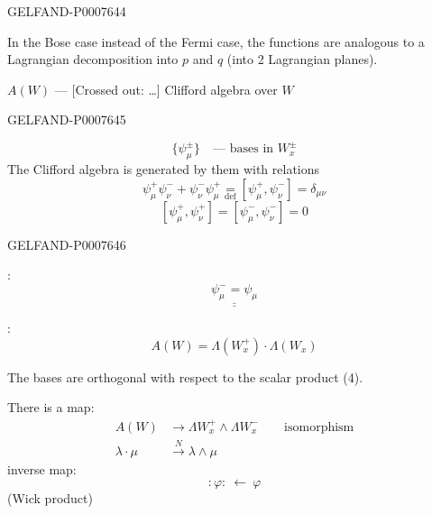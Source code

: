 \begin{GelfandAdjacentEvidence}{GELFAND-P000764}{4}


In the Bose case instead of the Fermi case, the functions are analogous to a Lagrangian decomposition into \(p\) and \(q\) (into 2 Lagrangian planes).

\(A(W)\) --- [Crossed out: …] Clifford algebra over \(W\)
\end{GelfandAdjacentEvidence}
\begin{GelfandAdjacentEvidence}{GELFAND-P000764}{5}

\[
\{\psi_\mu^\pm\}\quad\text{--- bases in }W_x^\pm
\]
The Clifford algebra is generated by them with relations
\begin{equation*}
\tag*{\((9)_1\)}
\psi_\mu^+\psi_\nu^-+\psi_\nu^-\psi_\mu^+
\underset{\mathrm{def}}{=}[\psi_\mu^+,\psi_\nu^-]=\delta_{\mu\nu}
\end{equation*}
\begin{equation*}
\tag*{\((9)_2\)}
[\psi_\mu^+,\psi_\nu^+]=[\psi_\mu^-,\psi_\nu^-]=0
\end{equation*}
\end{GelfandAdjacentEvidence}
\begin{GelfandAdjacentEvidence}{GELFAND-P000764}{6}


:
\[
\underline{\underline{\psi_\mu^-=\psi_\mu}}
\]

:
\begin{equation*}
\tag{10}
A(W)=\Lambda(W_x^+)\cdot\Lambda(W_x)
\end{equation*}
\end{GelfandAdjacentEvidence}


The bases are orthogonal with respect to the scalar product (4).

There is a map:
\[
\begin{aligned}
A(W)&\longrightarrow\Lambda W_x^+\wedge\Lambda W_x^-\qquad\text{isomorphism}\\
\lambda\cdot\mu&\overset{N}{\longrightarrow}\lambda\wedge\mu
\end{aligned}
\]
inverse map:
\[
{:}\varphi{:}\ \longleftarrow\ \varphi
\]
(Wick product)

